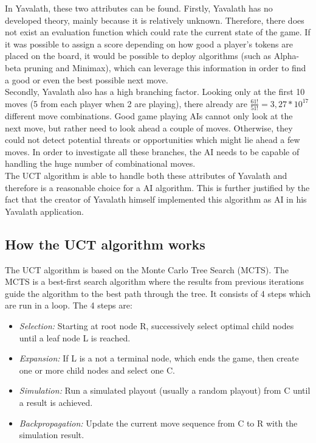 \documentclass[english]{report} \usepackage[english]{babel}
\begin{document}
In Yavalath, these two attributes can be found. Firstly, Yavalath has no
developed theory, mainly because it is relatively unknown. Therefore, there
does not exist an evaluation function which could rate the current state of the
game. If it was possible to assign a score depending on how good a player's
tokens are placed on the board, it would be possible to deploy algorithms (such
as Alpha-beta pruning and Minimax), which can leverage this information in order
to find a good or even the best possible next move.\\

Secondly, Yavalath also has a high branching factor. Looking only at the first
10 moves (5 from each player when 2 are playing), there already are
\(\frac{61!}{51!}=3,27*10^{17}\) different move combinations. Good game playing
AIs cannot only look at the next move, but rather need to look ahead a couple of
moves. Otherwise, they could not detect potential threats or opportunities which
might lie ahead a few moves. In order to investigate all these branches, the AI
needs to be capable of handling the huge number of combinational moves.\\

The UCT algorithm is able to handle both these attributes of Yavalath and
therefore is a reasonable choice for a AI algorithm. This is further justified
by the fact that the creator of Yavalath himself implemented this algorithm as
AI in his Yavalath application.\cite{yvalath}


\subsection{How the UCT algorithm works}

The UCT algorithm is based on the Monte Carlo Tree Search (MCTS). The MCTS is a
best-first search algorithm where the results from previous iterations guide the
algorithm to the best path through the tree. It consists of 4 steps which are
run in a loop. The 4 steps\cite{mcts}\cite{wiki:mcts} are:
\begin{itemize}
	\item \textit{Selection:} Starting at root node R, successively select optimal child nodes until a leaf node L is reached.
	\item \textit{Expansion:}  If L is a not a terminal node, which ends the game, then create one or more child nodes and select one C.
	\item \textit{Simulation:}  Run a simulated playout (usually a random playout) from C until a result is achieved.
	\item \textit{Backpropagation:}  Update the current move sequence from C to R with the simulation result.
\end{itemize}
\end{document}
